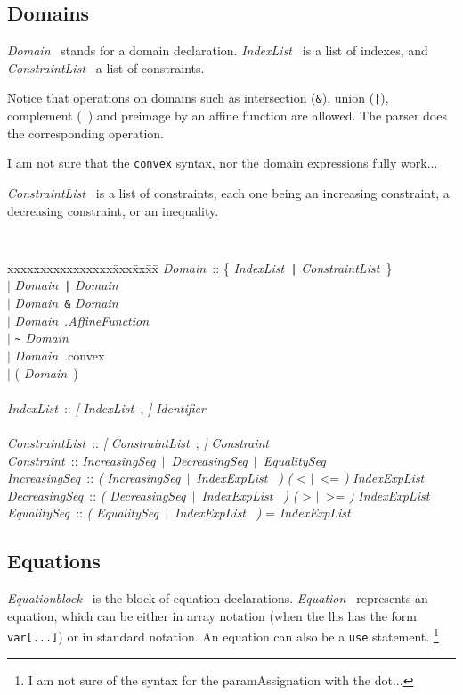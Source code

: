 \documentclass[12pt]{article}
\newcommand{\Opt}[1]{{\rm\sl [} #1 {\rm\sl ]}}
\newcommand{\Group}[1]{{\rm\sl (} #1 {\rm\sl )}}
\newcommand{\Alt}{$\mid$}
\newcommand{\EquationBlock}{{\sl Equationblock\ }}
\newcommand{\Domain}{{\sl Domain\ }}
\newcommand{\Identifier}{{\sl Identifier\ }}
\newcommand{\IndexList}{{\sl IndexList\ }}
\newcommand{\ConstraintList}{{\sl ConstraintList\ }}
\newcommand{\AffineFunction}{{\sl AffineFunction\ }}
\newcommand{\Constraint}{{\sl Constraint\ }}
\newcommand{\IncreasingSeq}{{\sl IncreasingSeq\ }}
\newcommand{\DecreasingSeq}{{\sl DecreasingSeq\ }}
\newcommand{\EqualitySeq}{{\sl EqualitySeq\ }}
\newcommand{\IndexExpList}{{\sl IndexExpList\ }}
\newcommand{\Equation}{{\sl Equation\ }}
\begin{document}
\subsection{Domains}
\Domain{} stands for a domain declaration. \IndexList{} is
a list of indexes, and \ConstraintList{} a list of constraints. 

Notice that operations on domains such as intersection
(\texttt{\&}), union (\texttt{|}), complement (\texttt{~}) and
preimage by an affine function are allowed. The parser 
does the corresponding operation. 

I am not sure that the \texttt{convex} syntax, nor the 
domain expressions fully work...

\ConstraintList{} is a list of constraints, each one being an
increasing constraint, a decreasing constraint, or an 
inequality.
{\tt
\begin{tabbing}
xxxxxxxxxxxxxxxx\= xxx\= xx\=  xx\= \kill
\Domain \>::\>\> \{ \IndexList \verb~|~ \ConstraintList \}\\
\>\>\Alt\> \Domain \verb~|~ \Domain\\
\>\>\Alt\> \Domain \verb~&~ \Domain\\
\>\>\Alt\> \Domain .\AffineFunction\\
\>\>\Alt\> \verb'~' \Domain\\
\>\>\Alt\> \Domain .convex\\
\>\>\Alt\> ( \Domain )\\
\\
\IndexList\>::\>\> \Opt{\IndexList ,} \Identifier\\
\\
\ConstraintList\>::\>\> \Opt{\ConstraintList ;} \Constraint\\
\Constraint \>::\>\> \IncreasingSeq \Alt\ \DecreasingSeq \Alt\ \EqualitySeq\\
\IncreasingSeq \>::\>\> \Group{ \IncreasingSeq \Alt\ \IndexExpList }
  \Group{ < \Alt\ <= } \IndexExpList\\
\DecreasingSeq \>::\>\> \Group{ \DecreasingSeq \Alt\ \IndexExpList }
  \Group{ > \Alt\ >= } \IndexExpList\\
\EqualitySeq\>::\>\> \Group{ \EqualitySeq \Alt\ \IndexExpList } = \IndexExpList
\end{tabbing}
}

\subsection{Equations}
\EquationBlock{} is the block of equation declarations. 
\Equation{} represents an equation, which can be either 
in array notation (when the lhs has the form \texttt{var[...]})
or in standard notation. An equation can also be a \texttt{use} statement.
\footnote{I am not sure of the syntax for the 
paramAssignation with the dot...}
\end{document}
